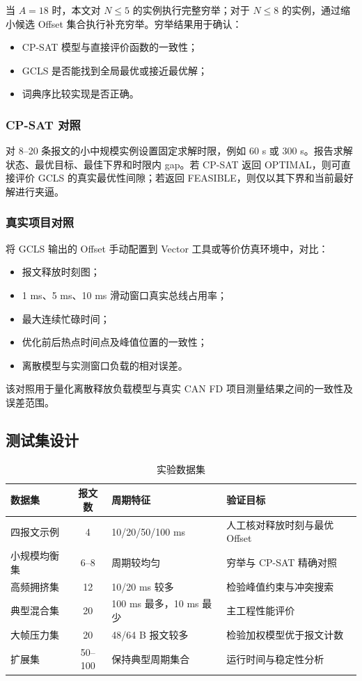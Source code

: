\documentclass[UTF8,12pt,a4paper]{ctexart}
\begin{document}
当 $A=18$ 时，本文对 $N\le5$ 的实例执行完整穷举；对于 $N\le8$ 的实例，通过缩小候选 Offset 集合执行补充穷举。穷举结果用于确认：

\begin{itemize}
  \item CP-SAT 模型与直接评价函数的一致性；
  \item GCLS 是否能找到全局最优或接近最优解；
  \item 词典序比较实现是否正确。
\end{itemize}

\subsubsection{CP-SAT 对照}

对 8--20 条报文的小中规模实例设置固定求解时限，例如 60 s 或 300 s。报告求解状态、最优目标、最佳下界和时限内 gap。若 CP-SAT 返回 OPTIMAL，则可直接评价 GCLS 的真实最优性间隙；若返回 FEASIBLE，则仅以其下界和当前最好解进行夹逼。

\subsubsection{真实项目对照}

将 GCLS 输出的 Offset 手动配置到 Vector 工具或等价仿真环境中，对比：

\begin{itemize}
  \item 报文释放时刻图；
  \item 1 ms、5 ms、10 ms 滑动窗口真实总线占用率；
  \item 最大连续忙碌时间；
  \item 优化前后热点时间点及峰值位置的一致性；
  \item 离散模型与实测窗口负载的相对误差。
\end{itemize}

该对照用于量化离散释放负载模型与真实 CAN FD 项目测量结果之间的一致性及误差范围。

\subsection{测试集设计}

\begin{table}[htbp]
\centering
\caption{实验数据集}
\label{tab:testsets}
\begin{tabularx}{\textwidth}{lclX}
\toprule
数据集 & 报文数 & 周期特征 & 验证目标\\
\midrule
四报文示例 & 4 & 10/20/50/100 ms & 人工核对释放时刻与最优 Offset\\
小规模均衡集 & 6--8 & 周期较均匀 & 穷举与 CP-SAT 精确对照\\
高频拥挤集 & 12 & 10/20 ms 较多 & 检验峰值约束与冲突搜索\\
典型混合集 & 20 & 100 ms 最多，10 ms 最少 & 主工程性能评价\\
大帧压力集 & 20 & 48/64 B 报文较多 & 检验加权模型优于报文计数\\
扩展集 & 50--100 & 保持典型周期集合 & 运行时间与稳定性分析\\
\bottomrule
\end{tabularx}
\end{table}
\end{document}
